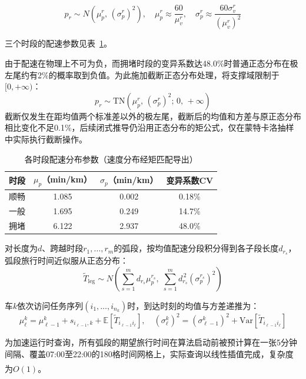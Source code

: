 \documentclass[12pt,a4paper]{article}
\newcommand{\upcite}[1]{\textsuperscript{\textsuperscript{\cite{#1}}}}
\begin{document}
\begin{equation}
p_r\sim N\!\left(\mu_p^r,\,(\sigma_p^r)^2\right),\quad \mu_p^r\approx \frac{60}{\mu_v^r},\quad \sigma_p^r\approx \frac{60\sigma_v^r}{(\mu_v^r)^2}
\end{equation}

三个时段的配速参数见表~\ref{tab:pace}。

由于配速在物理上不可为负，而拥堵时段的变异系数达48.0\%时普通正态分布在极左尾约有2\%的概率取到负值。为此施加截断正态分布处理，将支撑域限制于$[0, +\infty)$：
\begin{equation}
p_r \sim \mathrm{TN}\!\left(\mu_p^r,\, (\sigma_p^r)^2;\, 0,\, +\infty\right)
\end{equation}
截断仅发生在距均值两个标准差以外的极左尾，截断后的均值和方差与原正态分布相比变化不足0.1\%，后续闭式推导仍沿用正态分布的矩公式，仅在蒙特卡洛抽样中实际执行截断操作。

\begin{table}[H]
\centering
\begin{tabular}{lccc}
\toprule
时段 & $\mu_p$（min/km） & $\sigma_p$（min/km） & 变异系数CV \\
\midrule
顺畅 & 1.085 & 0.002 & 0.18\% \\
一般 & 1.695 & 0.249 & 14.7\% \\
拥堵 & 6.122 & 2.937 & 48.0\% \\
\bottomrule
\end{tabular}
\caption{各时段配速分布参数（速度分布经矩匹配导出）}\label{tab:pace}
\end{table}

对长度为$d$、跨越时段$r_1,\dots,r_m$的弧段，按均值配速分段积分得到各子段长度$d_{r_s}$，弧段旅行时间近似服从正态分布：
\begin{equation}
\tilde T_{\text{leg}}\sim N\!\left(\sum_{s=1}^{m}d_{r_s}\mu_p^{r_s},\;\sum_{s=1}^{m}d_{r_s}^{\,2}(\sigma_p^{r_s})^2\right)
\end{equation}

车$k$依次访问任务序列$(i_1,\dots,i_{n_k})$时，到达时刻的均值与方差递推为：
\begin{equation}
\mu_\ell^k=\mu_{\ell-1}^k+s_{i_{\ell-1},k}+\mathbb{E}[\tilde T_{i_{\ell-1}i_\ell}],\quad
(\sigma_\ell^k)^2=(\sigma_{\ell-1}^k)^2+\mathrm{Var}[\tilde T_{i_{\ell-1}i_\ell}]
\end{equation}

为加速运行时查询，所有弧段的期望旅行时间在算法启动前被预计算在一张5分钟间隔、覆盖07:00至22:00的180格时间网格上，实际查询以线性插值完成，复杂度为$O(1)$\upcite{hashimoto2008}。
\end{document}
